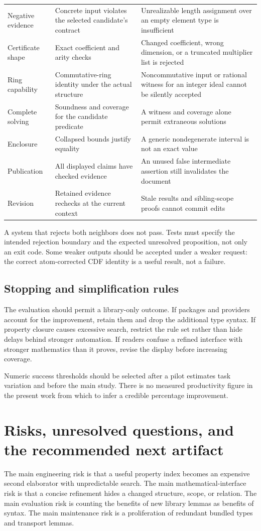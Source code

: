 \documentclass[11pt,a4paper]{article}
\theoremstyle{plain}
\theoremstyle{definition}
\theoremstyle{remark}
\begin{document}
{\begin{longtable}{@{}P{29mm}P{52mm}P{64mm}@{}}
Negative evidence & Concrete input violates the selected candidate's contract & Unrealizable length assignment over an empty element type is insufficient\\
Certificate shape & Exact coefficient and arity checks & Changed coefficient, wrong dimension, or a truncated multiplier list is rejected\\
Ring capability & Commutative-ring identity under the actual structure & Noncommutative input or rational witness for an integer ideal cannot be silently accepted\\
Complete solving & Soundness and coverage for the candidate predicate & A witness and coverage alone permit extraneous solutions\\
Enclosure & Collapsed bounds justify equality & A generic nondegenerate interval is not an exact value\\
Publication & All displayed claims have checked evidence & An unused false intermediate assertion still invalidates the document\\
Revision & Retained evidence rechecks at the current context & Stale results and sibling-scope proofs cannot commit edits\\
\end{longtable}}

A system that rejects both neighbors does not pass. Tests must specify the
intended rejection boundary and the expected unresolved proposition, not only
an exit code. Some weaker outputs should be accepted under a weaker request:
the correct atom-corrected CDF identity is a useful result, not a failure.

\subsection{Stopping and simplification rules}
The evaluation should permit a library-only outcome. If packages and providers
account for the improvement, retain them and drop the additional type syntax.
If property closure causes excessive search, restrict the rule set rather than
hide delays behind stronger automation. If readers confuse a refined interface
with stronger mathematics than it proves, revise the display before increasing
coverage.

Numeric success thresholds should be selected after a pilot estimates task
variation and before the main study. There is no measured productivity figure
in the present work from which to infer a credible percentage improvement.

\section{Risks, unresolved questions, and the recommended next artifact}
\label{sec:risks}
The main engineering risk is that a useful property index becomes an expensive
second elaborator with unpredictable search. The main mathematical-interface
risk is that a concise refinement hides a changed structure, scope, or
relation. The main evaluation risk is counting the benefits of new library
lemmas as benefits of syntax. The main maintenance risk is a proliferation
of redundant bundled types and transport lemmas.
\end{document}
